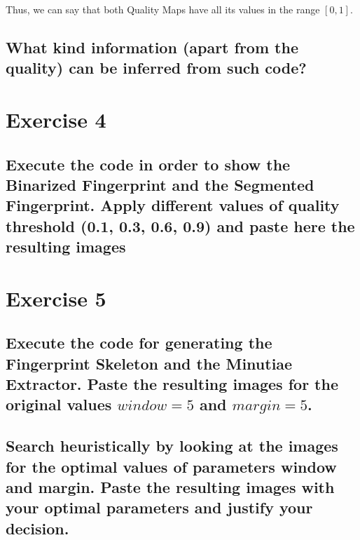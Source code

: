 \documentclass[a4paper]{article}
\begin{document}
Thus, we can say that both Quality Maps have all its values in the range \([0,1]\).

\subsection{ What kind information (apart from the quality) can be inferred from such code?}

\section{Exercise 4}

\subsection{ Execute the code in order to show the Binarized Fingerprint and the Segmented Fingerprint. Apply different values of quality threshold (0.1, 0.3, 0.6, 0.9) and paste here the resulting images}






\section{Exercise 5}
\subsection{ Execute the code for generating the Fingerprint Skeleton and the Minutiae Extractor. Paste the resulting images for the original values \(window=5\) and \(margin=5\). }






















\subsection{Search heuristically by looking at the images for the optimal values of parameters window and margin. Paste the resulting images with your optimal parameters and justify your decision.}
\end{document}
